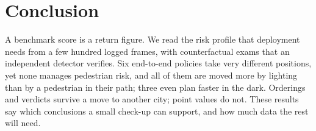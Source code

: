 \section{Conclusion}
A benchmark score is a return figure. We read the risk profile that deployment needs from a few
hundred logged frames, with counterfactual exams that an independent detector verifies. Six end-to-end
policies take very different positions, yet none manages pedestrian risk, and all of them are moved
more by lighting than by a pedestrian in their path; three even plan faster in the dark. Orderings and verdicts survive a move to another
city; point values do not. These results say which conclusions a small check-up can support, and how
much data the rest will need.
